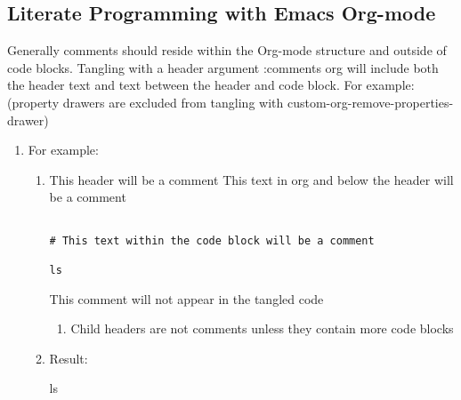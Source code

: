 \documentclass{article}
\begin{document}
\subsection{Literate Programming with Emacs Org-mode}
\label{sec:orgeaa829d}

Generally comments should reside within the Org-mode structure and outside of code blocks. Tangling with a header argument :comments org will include both the header text and text between the header and code block. For example:\\[0pt]

(property drawers are excluded from tangling with custom-org-remove-properties-drawer)\\[0pt]
\begin{enumerate}
\item For example:
\label{sec:orgf582b06}
\begin{enumerate}
\item This header will be a comment
\label{sec:org7dc608f}
This text in org and below the header will be a comment\\[0pt]

\begin{verbatim}

# This text within the code block will be a comment

ls

\end{verbatim}

This comment will not appear in the tangled code\\[0pt]

\begin{enumerate}
\item Child headers are not comments unless they contain more code blocks
\label{sec:org8f7765a}
\end{enumerate}
\item Result:
\label{sec:orgcd9684c}

ls\\[0pt]
\end{enumerate}
\end{enumerate}
\end{document}
